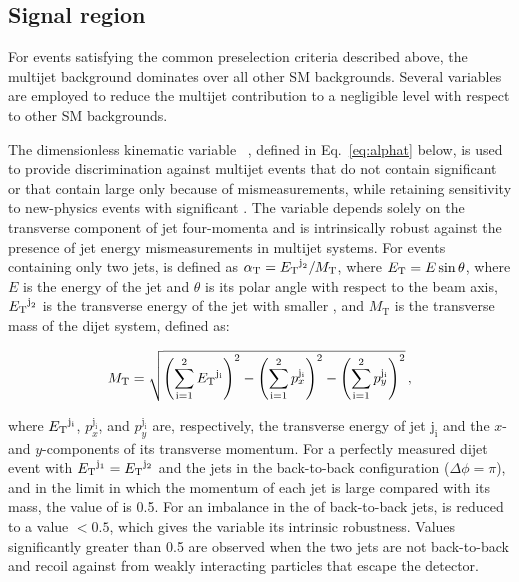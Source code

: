 \subsection{Signal region}
\label{sec:signal_region} 

For events satisfying the common preselection criteria described
above, the multijet background dominates over all other SM
backgrounds. Several variables are employed to reduce the multijet
contribution to a negligible level with respect to other SM
backgrounds.

The dimensionless kinematic variable \alphat~\cite{Randall:2008rw,
  RA1Paper}, defined in Eq.~\ref{eq:alphat} below, is used to provide
discrimination against multijet events that do not contain significant
\ptvecmiss or that contain large \ptvecmiss only because of \Pt
mismeasurements, while retaining sensitivity to new-physics events
with significant \ptvecmiss. The \alphat variable depends solely on
the transverse component of jet four-momenta
and is intrinsically robust against the presence of jet energy
mismeasurements in multijet systems. For events containing only two
jets, \alphat is defined as $\alpha_{\text{T}} = {E_{\text T}}^{\text j_2}/M_\text{T}$,
where ${E_{\text T}} = E\sin\theta$, 
where $E$ is the energy of the jet and $\theta$ is its polar angle
with respect to the beam axis, ${E_{\text T}}^{\text j_2}$ is the transverse
energy of the jet with smaller \Et, and $M_\text{T}$ is the transverse
mass of the dijet system, defined as:

\begin{equation}
  \label{eq:mt}
  M_\text{T} = \sqrt{ \left( \sum_{\textrm{i}=1}^2 {E_{\text T}}^{\mathrm{j_i}}
    \right)^2 - \left( \sum_{\textrm{i}=1}^2 p_x^{\mathrm{j_i}} \right)^2 - \left(
      \sum_{\textrm{i}=1}^2 p_y^{\mathrm{j_i}} \right)^2}\, ,
\end{equation}

where ${E_{\text T}}^{\mathrm{j_i}}$, $p_x^{\mathrm{j_i}}$, and
$p_y^{\mathrm{j_i}}$ 
are, respectively, the transverse energy of jet $\mathrm{j_i}$ and the
$x$- and $y$-components of its transverse momentum.  For a perfectly
measured dijet event with ${E_{\text T}}^{\mathrm{j_1}} = {E_{\text T}}^{\mathrm{j_2}}$
and the jets in the back-to-back configuration ($\Delta\phi = \pi$),
and in the limit in which the momentum of each jet is large compared
with its mass, the value of \alphat is 0.5. For an imbalance in the
\Et of back-to-back jets, \alphat is reduced to a value $<0.5$, which
gives the variable its intrinsic robustness. Values significantly
greater than 0.5 are observed when the two jets are not back-to-back
and recoil against \ptvecmiss from weakly interacting particles that
escape the detector.

